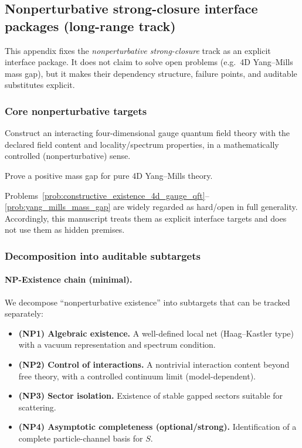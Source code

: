 \subsection{Nonperturbative strong-closure interface packages (long-range track)}
\label{app:nonpert_strong_closure_interface}

\AuditTag This appendix fixes the \emph{nonperturbative strong-closure} track as an explicit interface package.
It does not claim to solve open problems (e.g.\ 4D Yang--Mills mass gap), but it makes their dependency structure, failure points, and auditable substitutes explicit.

\subsubsection{Core nonperturbative targets}
\begin{problem}
\label{prob:constructive_existence_4d_gauge_qft}
Construct an interacting four-dimensional gauge quantum field theory with the declared field content and locality/spectrum properties, in a mathematically controlled (nonperturbative) sense.
\end{problem}

\begin{problem}
\label{prob:yang_mills_mass_gap}
Prove a positive mass gap for pure 4D Yang--Mills theory.
\end{problem}

\AuditTag Problems~\ref{prob:constructive_existence_4d_gauge_qft}--\ref{prob:yang_mills_mass_gap} are widely regarded as hard/open in full generality.
Accordingly, this manuscript treats them as explicit interface targets and does not use them as hidden premises.

\subsubsection{Decomposition into auditable subtargets}
\paragraph{NP-Existence chain (minimal).}
We decompose ``nonperturbative existence'' into subtargets that can be tracked separately:
\begin{itemize}
\item \textbf{(NP1) Algebraic existence.} A well-defined local net (Haag--Kastler type) with a vacuum representation and spectrum condition.
\item \textbf{(NP2) Control of interactions.} A nontrivial interaction content beyond free theory, with a controlled continuum limit (model-dependent).
\item \textbf{(NP3) Sector isolation.} Existence of stable gapped sectors suitable for scattering.
\item \textbf{(NP4) Asymptotic completeness (optional/strong).} Identification of a complete particle-channel basis for $S$.
\end{itemize}

